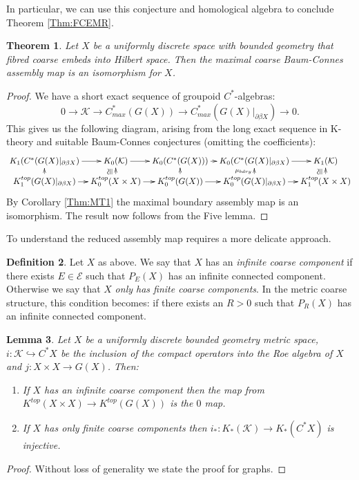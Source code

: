\documentclass[11pt]{amsart}
\theoremstyle{plain}
\newtheorem{theorem}{Theorem}%
\newtheorem{lemma}[theorem]{Lemma}%
\theoremstyle{definition}%
\newtheorem{definition}[theorem]{Definition}%
\theoremstyle{remark}%
\newcommand{\ucong}{\rotatebox{90}{$\cong$}}
\begin{document}
{In particular, we can use this conjecture and homological algebra to conclude Theorem \ref{Thm:FCEMR}.

\begin{theorem}
Let $X$ be a uniformly discrete space with bounded geometry that fibred coarse embeds into Hilbert space. Then the maximal coarse Baum-Connes assembly map is an isomorphism for $X$.
\end{theorem}
\begin{proof}
We have a short exact sequence of groupoid $C^{*}$-algebras:
\begin{equation*}
0 \rightarrow \mathcal{K} \rightarrow C^{*}_{max}(G(X)) \rightarrow C^{*}_{max}(G(X)|_{\partial\beta X}) \rightarrow 0.
\end{equation*}
This gives us the following diagram, arising from the long exact sequence in K-theory and suitable Baum-Connes conjectures (omitting the coefficients):
\begin{equation*}
\xymatrix@=0.7em{
K_{1}(C^{*}(G(X)|_{\partial\beta X}) \ar[r] & K_{0}(\mathcal{K}) \ar[r]& K_{0}(C^{*}(G(X))) \ar[r]& K_{0}(C^{*}(G(X)|_{\partial\beta X})\ar[r] & K_{1}(\mathcal{K})  \\
K_{1}^{top}(G(X)|_{\partial\beta X}) \ar[r] \ar[u]& K_{0}^{top}(X \times X) \ar[r]\ar[u]^{\ucong}& K_{0}^{top}(G(X)) \ar[r]\ar[u]& K_{0}^{top}(G(X)|_{\partial\beta X}) \ar[r]\ar[u]^{\mu_{bdry}}& K_{1}^{top}(X \times X)\ar[u]^{\ucong}
}
\end{equation*}
By Corollary \ref{Thm:MT1} the maximal boundary assembly map is an isomorphism. The result now follows from the Five lemma.
\end{proof}

To understand the reduced assembly map requires a more delicate approach.

\begin{definition}
Let $X$ as above. We say that $X$ has an \textit{infinite coarse component} if there exists $E \in \mathcal{E}$ such that $P_{E}(X)$ has an infinite connected component. Otherwise we say that $X$ \textit{only has finite coarse components}. In the metric coarse structure, this condition becomes: if there exists an $R>0$ such that $P_{R}(X)$ has an infinite connected component.
\end{definition}

\begin{lemma}\label{lem:zandi}
Let $X$ be a uniformly discrete bounded geometry metric space, $i: \mathcal{K} \hookrightarrow C^{*}X$ be the inclusion of the compact operators into the Roe algebra of $X$ and $j:X\times X \rightarrow G(X)$. Then:
\begin{enumerate}
\item If $X$ has an infinite coarse component then the map from $K^{top}(X \times X) \rightarrow K^{top}(G(X))$ is the $0$ map.
\item If $X$ has only finite coarse components then $i_{*}:K_{*}(\mathcal{K}) \rightarrow K_{*}(C^{*}X)$ is injective.
\end{enumerate}
\end{lemma}
\begin{proof}
Without loss of generality we state the proof for graphs. 


\end{proof}}
\end{document}
